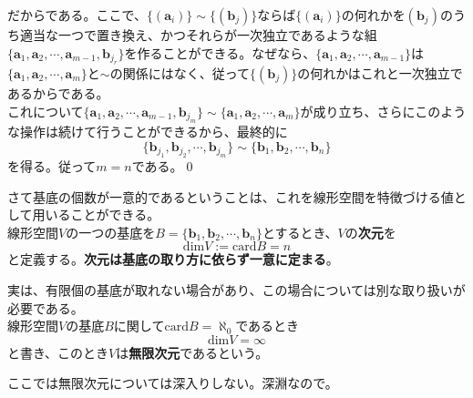 \documentclass[dvipdfmx]{jsarticle}
\begin{document}
だからである。ここで、$\{(\bm{a}_i)\}\sim\{(\bm{b}_j)\}$ならば$\{(\bm{a}_i)\}$の何れかを$(\bm{b}_j)$のうち適当な一つで置き換え、かつそれらが一次独立であるような組$\{\bm{a}_1,\bm{a}_2,\cdots,\bm{a}_{m-1},\bm{b}_{j_r}\}$を作ることができる。なぜなら、$\{\bm{a}_1,\bm{a}_2,\cdots,\bm{a}_{m-1}\}$は$\{\bm{a}_1,\bm{a}_2,\cdots,\bm{a}_m\}$と$\sim$の関係にはなく、従って$\{(\bm{b}_j)\}$の何れかはこれと一次独立であるからである。\\
これについて$\{\bm{a}_1,\bm{a}_2,\cdots,\bm{a}_{m-1},\bm{b}_{j_m}\}\sim\{\bm{a}_1,\bm{a}_2,\cdots,\bm{a}_m\}$が成り立ち、さらにこのような操作は続けて行うことができるから、最終的に
\[\{\bm{b}_{j_1},\bm{b}_{j_2},\cdots,\bm{b}_{j_m}\}\sim\{\bm{b}_1,\bm{b}_2,\cdots,\bm{b}_n\}\]
を得る。従って$m=n$である。\qed\\\par
さて基底の個数が一意的であるということは、これを線形空間を特徴づける値として用いることができる。\\
線形空間$V$の一つの基底を$B=\{\bm{b}_1,\bm{b}_2,\cdots,\bm{b}_n\}$とするとき、$V$の\textbf{次元}を
\[\mathrm{dim}V:=\mathrm{card}B=n\]
と定義する。\textbf{次元は基底の取り方に依らず一意に定まる}。\\\par
実は、有限個の基底が取れない場合があり、この場合については別な取り扱いが必要である。\\
線形空間$V$の基底$B$に関して$\mathrm{card}B=\aleph_0$であるとき
\[\mathrm{dim}V=\infty\]
と書き、このとき$V$は\textbf{無限次元}であるという。\\\par
ここでは無限次元については深入りしない。深淵なので。
\end{document}
